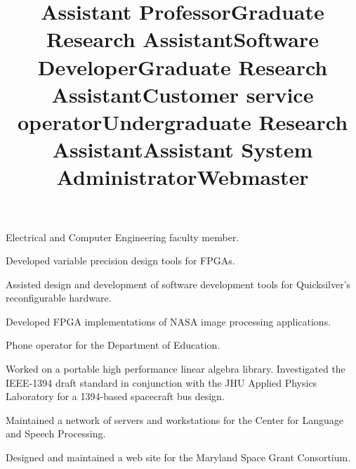 \documentclass[line]{res}
\begin{document}
\begin{resume}
	\title{Assistant Professor} 
	  
	\begin{position}
		Electrical and Computer Engineering faculty member. 
	\end{position}
	
	\title{Graduate Research Assistant} 
	  
	\begin{position}
		Developed variable precision design tools for FPGAs. 
	\end{position}
	
	\title{Software Developer} 
	  
	\begin{position}
		Assisted design and development of software development tools for Quicksilver's reconfigurable hardware. 
	\end{position}
	
	\title{Graduate Research Assistant} 
	  
	\begin{position}
		Developed FPGA implementations of NASA image processing applications. 
	\end{position}
	
	\title{Customer service operator} 
	  
	\begin{position}
		Phone operator for the Department of Education. 
	\end{position}
	
	\title{Undergraduate Research Assistant} 
	  
	\begin{position}
		Worked on a portable high performance linear algebra library. Investigated the IEEE-1394 draft standard in conjunction with the JHU Applied Physics Laboratory for a 1394-based spacecraft bus design. 
	\end{position}
	
	\title{Assistant System Administrator} 
	\begin{position}
		Maintained a network of servers and workstations for the Center for Language and Speech Processing. 
	\end{position}
	
	\title{Webmaster} 
	\begin{position}
		Designed and maintained a web site for the Maryland Space Grant Consortium. 
	\end{position}
	

\end{resume}
\end{document}
